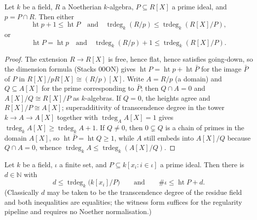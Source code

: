 \begin{lemma}
  \label{lem:polynomial_step_height_trdeg}
  Let \(k\) be a field, \(R\) a Noetherian \(k\)-algebra, \(P \subseteq R[X]\)
  a prime ideal, and \(p = P \cap R\). Then either
  \[\operatorname{ht} p + 1 \le \operatorname{ht} P
    \quad\text{and}\quad
    \operatorname{trdeg}_k (R/p) \le \operatorname{trdeg}_k (R[X]/P),\]
  or
  \[\operatorname{ht} P = \operatorname{ht} p
    \quad\text{and}\quad
    \operatorname{trdeg}_k (R/p) + 1 \le \operatorname{trdeg}_k (R[X]/P).\]
\end{lemma}

\begin{proof}
  \leanok
  The extension \(R \to R[X]\) is free, hence flat, hence satisfies going-down,
  so the dimension formula (Stacks 00ON) gives
  \(\operatorname{ht} P = \operatorname{ht} p + \operatorname{ht} \bar P\) for
  the image \(\bar P\) of \(P\) in \(R[X]/pR[X] \cong (R/p)[X]\). Write
  \(A = R/p\) (a domain) and \(Q \subseteq A[X]\) for the prime corresponding
  to \(\bar P\); then \(Q \cap A = 0\) and \(A[X]/Q \cong R[X]/P\) as
  \(k\)-algebras. If \(Q = 0\), the heights agree and
  \(R[X]/P \cong A[X]\); superadditivity of transcendence degree in the tower
  \(k \to A \to A[X]\) together with \(\operatorname{trdeg}_A A[X] = 1\) gives
  \(\operatorname{trdeg}_k A[X] \ge \operatorname{trdeg}_k A + 1\). If
  \(Q \neq 0\), then \(0 \subsetneq Q\) is a chain of primes in the domain
  \(A[X]\), so \(\operatorname{ht} \bar P = \operatorname{ht} Q \ge 1\), while
  \(A\) still embeds into \(A[X]/Q\) because \(Q \cap A = 0\), whence
  \(\operatorname{trdeg}_k A \le \operatorname{trdeg}_k (A[X]/Q)\).
\end{proof}

\begin{lemma}
  \label{lem:mvpoly_trdeg_height}
  Let \(k\) be a field, \(\iota\) a finite set, and
  \(P \subseteq k[x_i : i \in \iota]\) a prime ideal. Then there is
  \(d \in \mathbb N\) with
  \[d \le \operatorname{trdeg}_k \bigl(k[x_i]/P\bigr)
    \qquad\text{and}\qquad
    \#\iota \le \operatorname{ht} P + d.\]
  (Classically \(d\) may be taken to be the transcendence degree of the residue
  field and both inequalities are equalities; the witness form suffices for the
  regularity pipeline and requires no Noether normalisation.)
\end{lemma}

